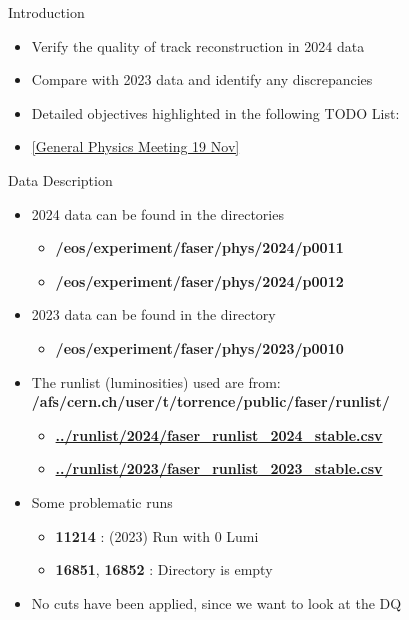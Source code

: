 \begin{frame}{Introduction}
    \begin{itemize}
        \item Verify the quality of track reconstruction in 2024 data
        \item Compare with 2023 data and identify any discrepancies
        \item Detailed objectives highlighted in the following TODO List:
        \item[] \href{https://indico.cern.ch/event/1476946/?note=304369}{[General Physics Meeting 19 Nov]}
    \end{itemize}
\end{frame}

\begin{frame}{Data Description}
    \begin{itemize}
        \item 2024 data can be found in the directories
              \begin{itemize}
                  \item \textbf{/eos/experiment/faser/phys/2024/p0011}
                  \item \textbf{/eos/experiment/faser/phys/2024/p0012}
              \end{itemize}
        \item 2023 data can be found in the directory
              \begin{itemize}
                  \item \textbf{/eos/experiment/faser/phys/2023/p0010}
              \end{itemize}
        \item The runlist (luminosities) used are from:
              \textbf{/afs/cern.ch/user/t/torrence/public/faser/runlist/}
              \begin{itemize}
                  \item \href{/afs/cern.ch/user/t/torrence/public/faser/runlist/2024/faser_runlist_2024_stable.csv}{\textbf{../runlist/2024/faser\_runlist\_2024\_stable.csv}}
                  \item \href{/afs/cern.ch/user/t/torrence/public/faser/runlist/2023/faser_runlist_2023_stable.csv}{\textbf{../runlist/2023/faser\_runlist\_2023\_stable.csv}}
              \end{itemize}
        \item Some problematic runs
              \begin{itemize}
                  \item \textbf{11214} : (2023) Run with 0 Lumi
                  \item \textbf{16851}, \textbf{16852} : Directory is empty
              \end{itemize}
        \item No cuts have been applied, since we want to look at the DQ
    \end{itemize}
\end{frame}

